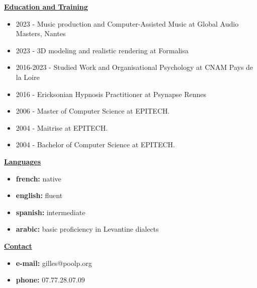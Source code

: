 \documentclass[a4paper,10pt]{letter}
\begin{document}
\underline{\textbf{Education and Training}}\\
\begin{itemize}
\item 2023 - Music production and Computer-Assisted Music at Global Audio Masters, Nantes
\item 2023 - 3D modeling and realistic rendering at Formalisa
\item 2016-2023 - Studied Work and Organisational Psychology at CNAM Pays de la Loire
\item 2016 - Ericksonian Hypnosis Practitioner at Psynapse Rennes
\item 2006 - Master of Computer Science at {EPITECH.}
\item 2004 - Maitrise at {EPITECH.}
\item 2004 - Bachelor of Computer Science at {EPITECH.}\\
\end{itemize}

\underline{\textbf{Languages}}\\
\begin{itemize}
\item	\textbf{french:}  native
\item	\textbf{english:} fluent
\item	\textbf{spanish:} intermediate
\item	\textbf{arabic:}  basic proficiency in Levantine dialects\\
\end{itemize}

\underline{\textbf{Contact}}\\
\begin{itemize}
\item	\textbf{e-mail:}	gilles@poolp.org
\item	\textbf{phone:}	07.77.28.07.09
\end{itemize}

\pagebreak
\end{document}
